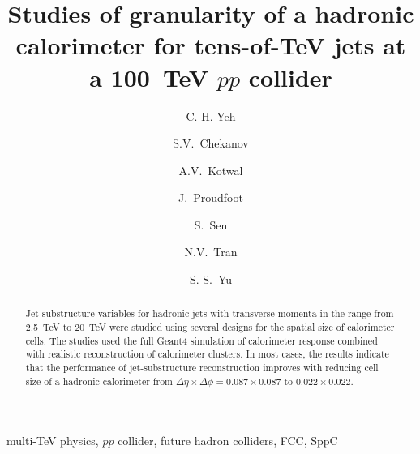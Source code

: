 \documentclass[final,1p,11pt]{elsarticle}
\begin{document}
\begin{frontmatter}

\title{
Studies of granularity of a hadronic calorimeter for tens-of-TeV jets  at a 100~TeV $pp$ collider 
}

\author[add3]{C.-H. Yeh}

\author[add1]{S.V.~Chekanov}

\author[addDuke]{A.V.~Kotwal}

\author[add1]{J.~Proudfoot}

\author[addDuke]{S.~Sen}

\author[add2]{N.V.~Tran}

\author[add3]{S.-S.~Yu}

\address[add3]{
Department of Physics, National Central University, Chung-Li, Taoyuan City 32001, Taiwan
}

\address[add1]{
HEP Division, Argonne National Laboratory,
9700 S.~Cass Avenue,
Argonne, IL 60439, USA. 
}

\address[addDuke]{
Department of Physics, Duke University, USA
}

\address[add2]{
Fermi National Accelerator Laboratory
}

\address[addMSU]{
Department of Physics, Michigan State University, 220
Trowbridge Road, East Lansing, MI 48824 
}




\begin{abstract}
Jet substructure variables for hadronic jets with transverse momenta in the range from 2.5~TeV to 20~TeV
were studied using several designs for the spatial size of calorimeter cells. The studies  used 
the full Geant4 simulation 
of calorimeter response combined with realistic reconstruction of calorimeter clusters.
In most cases, the results indicate that the performance of jet-substructure 
reconstruction improves with reducing cell size of a hadronic calorimeter 
from $\Delta \eta \times \Delta \phi = 0.087\times0.087$
to $0.022\times0.022$. 


\end{abstract}

\begin{keyword}
multi-TeV physics, $pp$ collider, future hadron colliders, FCC, SppC
\end{keyword}



\end{frontmatter}
\end{document}
